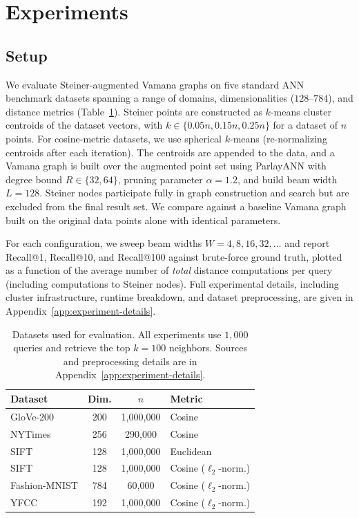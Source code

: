 
\section{Experiments}
\label{sec:experiments}

\subsection{Setup}

We evaluate Steiner-augmented Vamana graphs on five standard ANN benchmark datasets spanning a range of domains, dimensionalities ($128$--$784$), and distance metrics (Table~\ref{tab:datasets}). Steiner points are constructed as $k$-means cluster centroids of the dataset vectors, with $k \in \{0.05n, 0.15n, 0.25n\}$ for a dataset of $n$ points. For cosine-metric datasets, we use spherical $k$-means (re-normalizing centroids after each iteration). The centroids are appended to the data, and a Vamana graph is built over the augmented point set using ParlayANN with degree bound $R \in \{32, 64\}$, pruning parameter $\alpha = 1.2$, and build beam width $L = 128$. Steiner nodes participate fully in graph construction and search but are excluded from the final result set. We compare against a baseline Vamana graph built on the original data points alone with identical parameters.

For each configuration, we sweep beam widths $W = 4, 8, 16, 32, \ldots$ and report Recall@1, Recall@10, and Recall@100 against brute-force ground truth, plotted as a function of the average number of \emph{total} distance computations per query (including computations to Steiner nodes). Full experimental details, including cluster infrastructure, runtime breakdown, and dataset preprocessing, are given in Appendix~\ref{app:experiment-details}.

\begin{table}[t]
\centering
\small
\begin{tabular}{lccl}
\toprule
\textbf{Dataset} & \textbf{Dim.} & \textbf{$n$} & \textbf{Metric} \\
\midrule
GloVe-200        & 200 & 1{,}000{,}000 & Cosine \\
NYTimes          & 256 & 290{,}000     & Cosine \\
SIFT             & 128 & 1{,}000{,}000 & Euclidean \\
SIFT             & 128 & 1{,}000{,}000 & Cosine ($\ell_2$-norm.) \\
Fashion-MNIST    & 784 & 60{,}000      & Cosine ($\ell_2$-norm.) \\
YFCC             & 192 & 1{,}000{,}000 & Cosine ($\ell_2$-norm.) \\
\bottomrule
\end{tabular}
\caption{Datasets used for evaluation. All experiments use $1{,}000$ queries and retrieve the top $k = 100$ neighbors. Sources and preprocessing details are in Appendix~\ref{app:experiment-details}.}
\label{tab:datasets}
\end{table}

